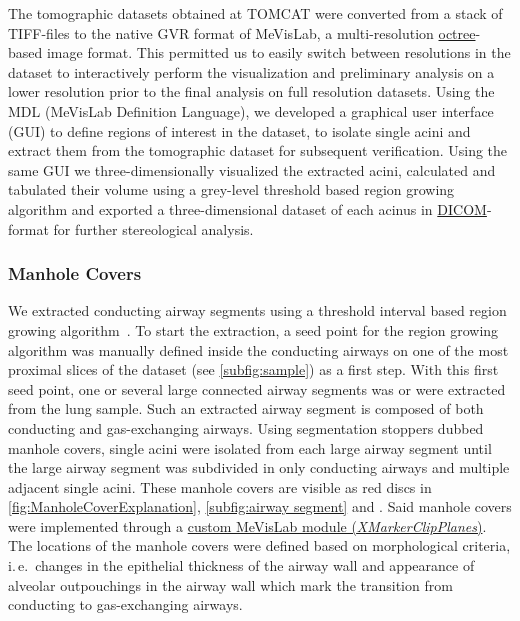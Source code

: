 \documentclass[twoside,paper=a4,abstract=true,english,DIV=calc]{scrartcl}
\newcommand{\ie}{i.\,e.\ }
\begin{document}
The tomographic datasets obtained at TOMCAT were converted from a stack of TIFF-files to the native GVR format of MeVisLab, a multi-resolution \href{https://secure.wikimedia.org/wikipedia/en/w/index.php?title=Octree&oldid=409131920}{octree}-based image format.
This permitted us to easily switch between resolutions in the dataset to interactively perform the visualization and preliminary analysis on a lower resolution prior to the final analysis on full resolution datasets.
Using the MDL (MeVisLab Definition Language), we developed a graphical user interface (GUI) to define regions of interest in the dataset, to isolate single acini and extract them from the tomographic dataset for subsequent verification.
Using the same GUI we three-dimensionally visualized the extracted acini, calculated and tabulated their volume using a grey-level threshold based region growing algorithm and exported a three-dimensional dataset of each acinus in \href{http://en.wikipedia.org/w/index.php?title=DICOM&oldid=511155074}{DICOM}-format for further stereological analysis.

\subsubsection{Manhole Covers}
We extracted conducting airway segments using a threshold interval based region growing algorithm~\cite{Zucker1976}.
To start the extraction, a seed point for the region growing algorithm was manually defined inside the conducting airways on one of the most proximal slices of the dataset (see \autoref{subfig:sample}) as a first step.
With this first seed point, one or several large connected airway segments was or were extracted from the lung sample.
Such an extracted airway segment is composed of both conducting and gas-exchanging airways.
Using segmentation stoppers dubbed manhole covers, single acini were isolated from each large airway segment until the large airway segment was subdivided in only conducting airways and multiple adjacent single acini.
These manhole covers are visible as red discs in \autoref{fig:ManholeCoverExplanation}, \autoref{subfig:airway segment} and .
Said manhole covers were implemented through a \href{http://www.mevis-research.de/cgi-bin/discus/board-auth.cgi?lm=1282233250&file=/839/11760.html}{custom MeVisLab module (\emph{XMarkerClipPlanes})}.
The locations of the manhole covers were defined based on morphological criteria, \ie changes in the epithelial thickness of the airway wall and appearance of alveolar outpouchings in the airway wall which mark the transition from conducting to gas-exchanging airways.
\end{document}
